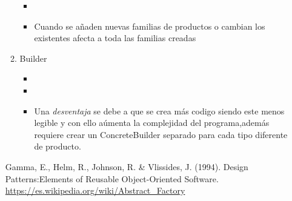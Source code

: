 \documentclass[a4paper,10pt]{article}
\begin{document}
\begin{enumerate}
\begin{enumerate}
\begin{itemize}
                \item [\Checkmark]
                      
                      

                \item [\XSolidBrush ] Cuando se añaden nuevas familias de productos o cambian los existentes afecta a toda las familias creadas 
                       
            \end{itemize}  
            

            \item \colorbox[rgb]{0.69, 0.61, 0.85}{Builder}
            \begin{itemize}
                \item [\Checkmark]
                
                \item [\Checkmark]


                \item [\XSolidBrush ] Una \textit{desventaja} se debe a que se crea más codigo siendo este menos legible y con ello aúmenta la complejidad del programa,además requiere crear
                      un ConcreteBuilder separado para cada tipo diferente de producto.  
            \end{itemize}
            
        \end{enumerate}

        \begin{thebibliography}{2}
             Gamma, E., Helm, R., Johnson, R. & Vlissides, J. (1994). Design Patterns:Elements of Reusable Object-Oriented Software.        
             \url{https://es.wikipedia.org/wiki/Abstract_Factory}                 
          \end{thebibliography}
        
        
       
        
                 

\end{enumerate}
\end{document}
